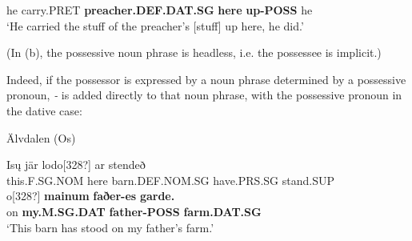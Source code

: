 he  carry.PRET  \textbf{preacher.DEF.DAT.SG} \textbf{here} \textbf{up-POSS} he\\

\glt ‘He carried the stuff of the preacher’s [stuff] up here, he did.’

\z

(In (b), the possessive noun phrase is headless, i.e. the possessee is implicit.) 


Indeed, if the possessor is expressed by a noun phrase determined by a possessive pronoun,\textit{ {}-} is added directly to that noun phrase, with the possessive pronoun in the dative case:


\item 

Älvdalen (Os)



\item 


 \ea\label{}
\gll Is\k{u}  jär  lodo[328?]  ar  stendeð\\


this.F.SG.NOM  here  barn.DEF.NOM.SG  have.PRS.SG  stand.SUP\\

 \ea\label{}
\gll o[328?]  \textbf{mainum} \textbf{faðer-es } \textbf{garde.} \\


on  \textbf{my.M.SG.DAT} \textbf{father-POSS} \textbf{farm.DAT.SG} \\

\glt ‘This barn has stood on my father’s farm.’

\z

\item 

